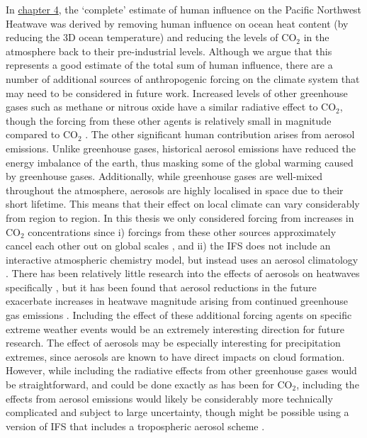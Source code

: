     In \hyperref[ch4]{chapter 4}, the `complete' estimate of human influence on the Pacific Northwest Heatwave was derived by removing human influence on ocean heat content (by reducing the 3D ocean temperature) and reducing the levels of CO$_2$ in the atmosphere back to their pre-industrial levels. Although we argue that this represents a good estimate of the total sum of human influence, there are a number of additional sources of anthropogenic forcing on the climate system that may need to be considered in future work. Increased levels of other greenhouse gases such as methane or nitrous oxide have a similar radiative effect to CO$_2$, though the forcing from these other agents is relatively small in magnitude compared to CO$_2$ \citep{masson-delmotte_earths_2021}. The other significant human contribution arises from aerosol emissions. Unlike greenhouse gases, historical aerosol emissions have reduced the energy imbalance of the earth, thus masking some of the global warming caused by greenhouse gases. Additionally, while greenhouse gases are well-mixed throughout the atmosphere, aerosols are highly localised in space due to their short lifetime. This means that their effect on local climate can vary considerably from region to region. In this thesis we only considered forcing from increases in CO$_2$ concentrations since i) forcings from these other sources approximately cancel each other out on global scales \citep{jenkins_quantifying_2021}, and ii) the IFS does not include an interactive atmospheric chemistry model, but instead uses an aerosol climatology \citep{bozzo_aerosol_2020}. There has been relatively little research into the effects of aerosols on heatwaves specifically \citep{horton_review_2016}, but it has been found that aerosol reductions in the future exacerbate increases in heatwave magnitude arising from continued greenhouse gas emissions \citep{zhao_strong_2019}. Including the effect of these additional forcing agents on specific extreme weather events would be an extremely interesting direction for future research. The effect of aerosols may be especially interesting for precipitation extremes, since aerosols are known to have direct impacts on cloud formation. However, while including the radiative effects from other greenhouse gases would be straightforward, and could be done exactly as has been for CO$_2$, including the effects from aerosol emissions would likely be considerably more technically complicated and subject to large uncertainty, though might be possible using a version of IFS that includes a tropospheric aerosol scheme \citep{remy_description_2019}.

